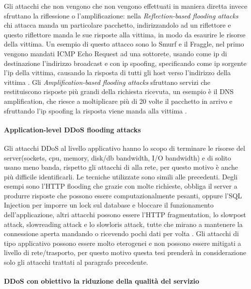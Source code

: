 Gli attacchi che non vengono che non vengono effettuati in maniera diretta invece sfruttano la riflessione o l'amplificazione: nella \emph{Reflection-based flooding attacks} chi attacca manda un particolare pacchetto, indirizzandolo ad un riflettore e questo riflettore manda le sue risposte alla vittima, in modo da esaurire le risorse della vittima. Un esempio di questo attacco sono lo Smurf e il Fraggle, nel primo vengono mandati ICMP Echo Request ad una sottorete, usando come ip di destinazione l'indirizzo broadcast e con ip spoofing, specificando come ip sorgente l'ip della vittima, causando la risposta di tutti gli host verso l'indirizzo della vittima \cite{ddos_survey_2}.
Gli \emph{Amplification-based flooding attacks} sfruttano servizi che restituiscono risposte più grandi della richiesta ricevuta, un esempio è il DNS amplification, che riesce a moltiplicare più di 20 volte il pacchetto in arrivo e sfruttando l'ip spoofing la risposta viene manda alla vittima \cite{ddos_survey_1}.
\paragraph{Application-level DDoS flooding attacks} %
Gli attacchi DDoS al livello applicativo hanno lo scopo di terminare le risorse del server(sockets, cpu, memory, disk/db bandwidth, I/O bandwidth) e di solito usano meno banda, rispetto gli attacchi di alla rete, per questo motivo è anche più difficile identificarli. Le tecniche utilizzate sono simili alle precedenti. Degli esempi sono l'HTTP flooding che grazie con molte richieste, obbliga il server a produrre risposte che possono essere computazionalmente pesanti, oppure l'SQL Injection per imporre un lock sul database e bloccare il funzionamento dell'applicazione, altri attacchi possono essere l'HTTP fragmentation, lo slowpost attack, slowreading attack e lo slowloris attack, tutte che mirano a mantenere la connessione aperta mandando o ricevendo pochi dati per volta \cite{ddos_survey_1}.
Gli attacchi di tipo applicativo possono essere molto eterogenei e non possono essere mitigati a livello di rete/trasporto, per questo motivo questa tesi prenderà in considerazione solo gli attacchi trattati al paragrafo precedente.

\paragraph{DDoS con obiettivo la riduzione della qualità del servizio}

